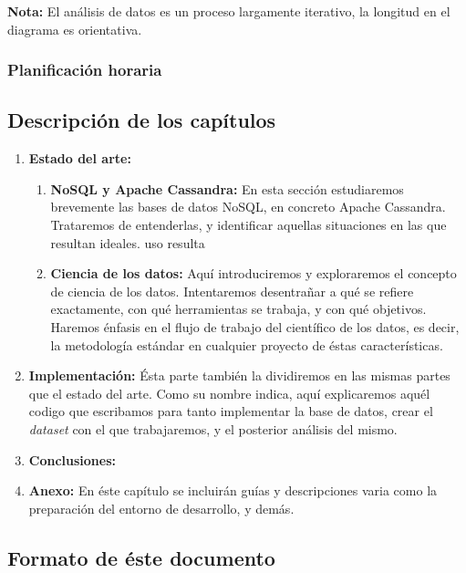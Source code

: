 \begin{center}
  \textbf{Nota: } El análisis de datos es un proceso largamente iterativo, la
  longitud en el diagrama es orientativa.
\end{center}


\subsubsection{Planificación horaria}
\label{subsubsec:hores}

\subsection{Descripción de los capítulos}
\label{subsec:chaps}

\begin{enumerate}
  \item \textbf{Estado del arte: }
    \begin{enumerate}
      \item \textbf{NoSQL y Apache Cassandra: } En esta sección estudiaremos
        brevemente las bases de datos NoSQL, en concreto Apache Cassandra.
        Trataremos de entenderlas, y identificar aquellas situaciones en las que
        resultan ideales.
        uso resulta
      \item \textbf{Ciencia de los datos: } Aquí introduciremos y exploraremos el
        concepto de ciencia de los datos. Intentaremos desentrañar a qué se refiere
        exactamente, con qué herramientas se trabaja, y con qué objetivos.
        Haremos énfasis en el flujo de trabajo del científico de los datos, es
        decir, la metodología estándar en cualquier proyecto de éstas características.
    \end{enumerate}

  \item \textbf{Implementación: }  Ésta parte también la dividiremos en las
    mismas partes que el estado del arte. Como su nombre indica, aquí
    explicaremos aquél codigo que escribamos para tanto implementar la base de
    datos, crear el \emph{dataset} con el que trabajaremos, y el posterior
    análisis del mismo.
  \item \textbf{Conclusiones: } 
  \item \textbf{Anexo: } En éste capítulo se incluirán guías y descripciones
    varia como la preparación del entorno de desarrollo, y demás.
\end{enumerate}

\subsection{Formato de éste documento}
\label{subsec:format}

